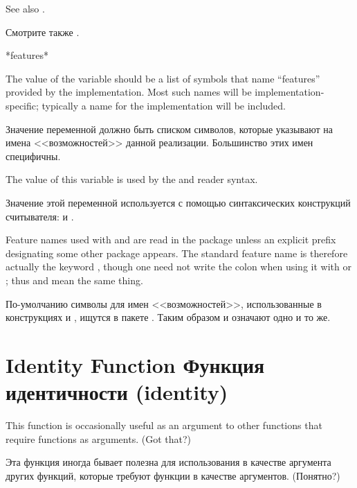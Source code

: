 \noindent
See also .

\noindent
Смотрите также .


\begin{defun}[Variable]
*features*

The value of the variable  should be a list of symbols
that name ``features'' provided by the implementation.
Most such names will be implementation-specific; typically
a name for the implementation will be included.

Значение переменной  должно быть списком символов, которые
указывают на имена <<возможностей>> данной реализации.
Большинство этих имен специфичны. 

The value of this variable is used by the \cd{\#+} and \cd{\#-}
reader syntax.

Значение этой переменной используется с помощью синтаксических конструкций
считывателя: \cd{\#+} и \cd{\#-}.

Feature names used with \cd{\#+} and \cd{\#-}
are read in the  package unless an explicit prefix
designating some other package appears.  The standard
feature name  is therefore actually the
keyword , though one need not write the colon
when using it with \cd{\#+} or \cd{\#-}; thus 
and  mean the same thing.

По-умолчанию символы для имен <<возможностей>>, использованные в конструкциях
\cd{\#+} и \cd{\#-}, ищутся в пакете
. Таким образом 
и  означают одно и то же.
\end{defun}


\section{Identity Function Функция идентичности (identity)}

This function is occasionally useful as an argument to
other functions that require functions as arguments.  (Got that?)

Эта функция иногда бывает полезна для использования в качестве аргумента других
функций, которые требуют функции в качестве аргументов. (Понятно?)

